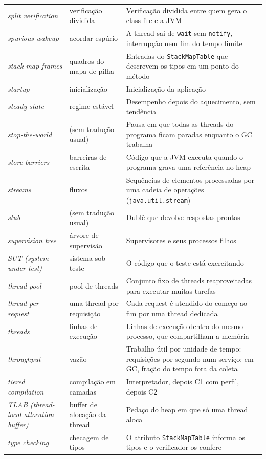 \begin{longtable}{@{}>{\raggedright}p{3.9cm} >{\raggedright}p{3.6cm} >{\raggedright\arraybackslash}p{6.3cm}@{}}
\textit{split verification} & verificação dividida & Verificação dividida entre quem gera o class file e a JVM \\
\textit{spurious wakeup} & acordar espúrio & A thread sai de \texttt{wait} sem \texttt{notify}, interrupção nem fim do tempo limite \\
\textit{stack map frames} & quadros do mapa de pilha & Entradas do \texttt{StackMapTable} que descrevem os tipos em um ponto do método \\
\textit{startup} & inicialização & Inicialização da aplicação \\
\textit{steady state} & regime estável & Desempenho depois do aquecimento, sem tendência \\
\textit{stop-the-world} & (sem tradução usual) & Pausa em que todas as threads do programa ficam paradas enquanto o GC trabalha \\
\textit{store barriers} & barreiras de escrita & Código que a JVM executa quando o programa grava uma referência no heap \\
\textit{streams} & fluxos & Sequências de elementos processadas por uma cadeia de operações (\texttt{java.util.stream}) \\
\textit{stub} & (sem tradução usual) & Dublê que devolve respostas prontas \\
\textit{supervision tree} & árvore de supervisão & Supervisores e seus processos filhos \\
\textit{SUT (system under test)} & sistema sob teste & O código que o teste está exercitando \\
\textit{thread pool} & pool de threads & Conjunto fixo de threads reaproveitadas para executar muitas tarefas \\
\textit{thread-per-request} & uma thread por requisição & Cada request é atendido do começo ao fim por uma thread dedicada \\
\textit{threads} & linhas de execução & Linhas de execução dentro do mesmo processo, que compartilham a memória \\
\textit{throughput} & vazão & Trabalho útil por unidade de tempo: requisições por segundo num serviço; em GC, fração do tempo fora da coleta \\
\textit{tiered compilation} & compilação em camadas & Interpretador, depois C1 com perfil, depois C2 \\
\textit{TLAB (thread-local allocation buffer)} & buffer de alocação da thread & Pedaço do heap em que só uma thread aloca \\
\textit{type checking} & checagem de tipos & O atributo \texttt{StackMapTable} informa os tipos e o verificador os confere \\

\end{longtable}
